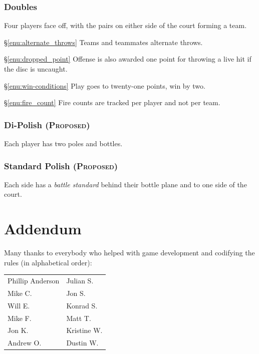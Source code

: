 \documentclass[11pt,letterpaper,twocolumn,english,DIV=calc]{scrartcl}
\newcommand{\proposed}{{\color{DarkRed}\textsc{(Proposed)} }}
\begin{document}
\section{Doubles}
Four players face off, with the pairs on either side of the court forming a team. 

\begin{description}
	\item{\S\ref{enu:alternate_throws}} Teams and teammates alternate throws. 
	\item{\S\ref{enu:dropped_point}} Offense is also awarded one point for throwing a live hit if the disc is uncaught.
	\item{\S\ref{enu:win-conditions}} Play goes to twenty-one points, win by two.
	\item{\S\ref{enu:fire_count}} Fire counts are tracked per player and not per team.
\end{description}

\section{Di-Polish \proposed}
Each player has two poles and bottles.

\section{Standard Polish \proposed}
Each side has a \emph{battle standard} behind their bottle plane and to one side of the court.


\newpage

\part*{Addendum}


Many thanks to everybody who helped with game development and codifying the rules (in alphabetical order):\medskip{}

\begin{tabular}{>{\raggedright}p{3.5cm}>{\raggedright}p{2.5cm}}
	Phillip Anderson & Julian S.\tabularnewline
	Mike C. & Jon S.\tabularnewline
	Will E. & Konrad S.\tabularnewline
	Mike F. & Matt T.\tabularnewline
	Jon K. & Kristine W.\tabularnewline
	Andrew O. & Dustin W.\tabularnewline
\end{tabular}
\end{document}
